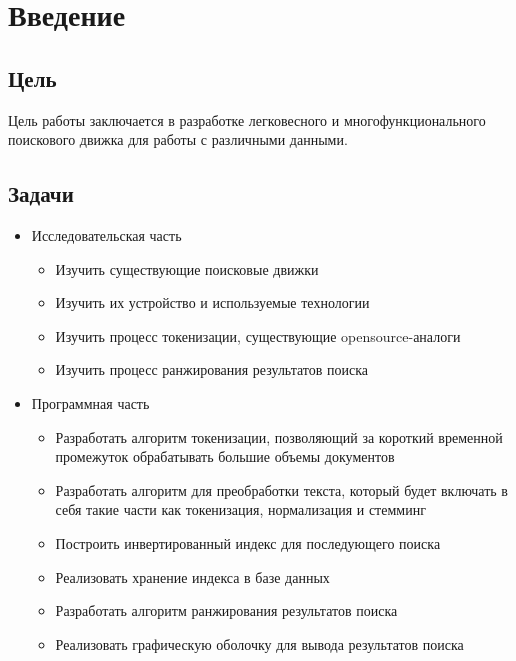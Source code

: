\section{Введение}
\subsection{Цель}
Цель работы заключается в разработке легковесного и многофункционального поискового движка для работы с различными данными. 

\subsection{Задачи}
\begin{itemize}
  \item{Исследовательская часть}
    \begin{itemize}
        \item {Изучить существующие поисковые движки}
        \item {Изучить их устройство и используемые технологии}
        \item {Изучить процесс токенизации, существующие opensource-аналоги}
        \item {Изучить процесс ранжирования результатов поиска}
    \end{itemize}
  \item{Программная часть}
      \begin{itemize}
        \item{Разработать алгоритм токенизации, позволяющий за короткий временной промежуток обрабатывать большие объемы документов}
        \item {Разработать алгоритм для преобработки текста, который будет включать в себя такие части как токенизация, нормализация и стемминг}
        \item {Построить инвертированный индекс для последующего поиска}
        \item {Реализовать хранение индекса  в базе данных}
        \item {Разработать алгоритм ранжирования результатов поиска}
        \item{Реализовать графическую оболочку для вывода результатов поиска}
    \end{itemize}
\end{itemize}

